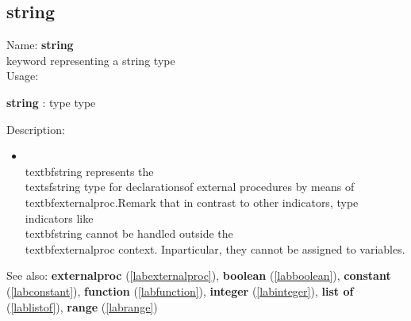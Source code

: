 \subsection{string}
\label{labstring}
\noindent Name: \textbf{string}\\
keyword representing a \textsf{string} type \\
\noindent Usage: 
\begin{center}
\textbf{string} : \textsf{type type}\\
\end{center}
\noindent Description: \begin{itemize}

\item \\textbf{string} represents the \\textsf{string} type for declarations\n   of external procedures by means of \\textbf{externalproc}.\n    \n   Remark that in contrast to other indicators, type indicators like\n   \\textbf{string} cannot be handled outside the \\textbf{externalproc} context.  In\n   particular, they cannot be assigned to variables.\n\end{itemize}
See also: \textbf{externalproc} (\ref{labexternalproc}), \textbf{boolean} (\ref{labboolean}), \textbf{constant} (\ref{labconstant}), \textbf{function} (\ref{labfunction}), \textbf{integer} (\ref{labinteger}), \textbf{list of} (\ref{lablistof}), \textbf{range} (\ref{labrange})
